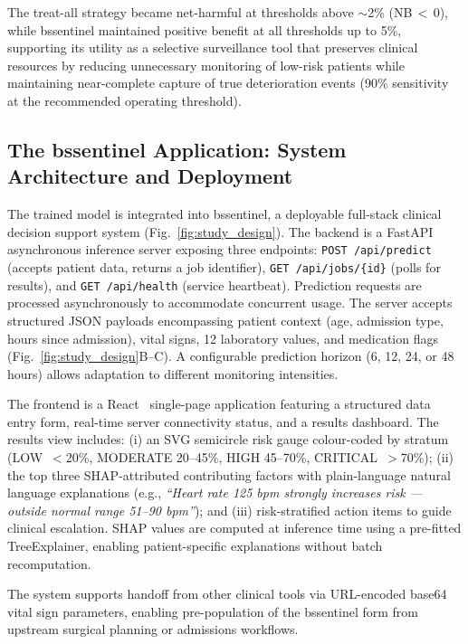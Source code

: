 \documentclass[12pt]{article}
\begin{document}
The treat-all strategy became net-harmful at thresholds above $\sim$2\%
(NB\,$<\,0$), while bssentinel maintained positive benefit at all thresholds
up to 5\%, supporting its utility as a selective surveillance tool that
preserves clinical resources by reducing unnecessary monitoring of low-risk
patients while maintaining near-complete capture of true deterioration events
(90\% sensitivity at the recommended operating threshold).

\subsection*{The bssentinel Application: System Architecture and Deployment}

The trained model is integrated into bssentinel, a deployable full-stack
clinical decision support system (Fig.~\ref{fig:study_design}). The backend
is a FastAPI~\cite{fastapi} asynchronous inference server exposing three
endpoints: \texttt{POST /api/predict} (accepts patient data, returns a job
identifier), \texttt{GET /api/jobs/\{id\}} (polls for results), and
\texttt{GET /api/health} (service heartbeat). Prediction requests are
processed asynchronously to accommodate concurrent usage. The server accepts
structured JSON payloads encompassing patient context (age, admission type,
hours since admission), vital signs, 12 laboratory values, and medication
flags (Fig.~\ref{fig:study_design}B--C). A configurable prediction horizon
(6, 12, 24, or 48 hours) allows adaptation to different monitoring intensities.

The frontend is a React~\cite{react} single-page application featuring a
structured data entry form, real-time server connectivity status, and a results
dashboard. The results view includes: (i) an SVG semicircle risk gauge
colour-coded by stratum (LOW~$<$20\%, MODERATE 20--45\%, HIGH 45--70\%,
CRITICAL~$>$70\%); (ii) the top three SHAP-attributed contributing factors
with plain-language natural language explanations (e.g., \emph{``Heart rate
125 bpm strongly increases risk --- outside normal range 51--90 bpm''}); and
(iii) risk-stratified action items to guide clinical escalation. SHAP values
are computed at inference time using a pre-fitted TreeExplainer, enabling
patient-specific explanations without batch recomputation.

The system supports handoff from other clinical tools via URL-encoded base64
vital sign parameters, enabling pre-population of the bssentinel form from
upstream surgical planning or admissions workflows.
\end{document}
